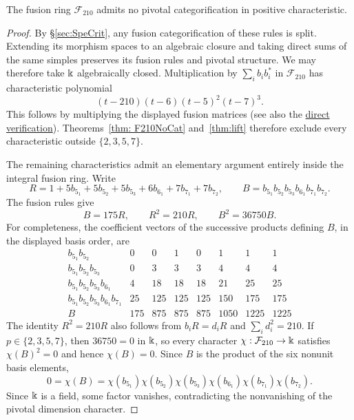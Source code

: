 \documentclass{amsart}
\begin{document}
\begin{corollary} \label{cor:PosChar}
The fusion ring $\mathcal{F}_{210}$ admits no pivotal categorification in positive characteristic.
\end{corollary}
\begin{proof}
By \S\ref{sec:SpeCrit}, any fusion categorification of these rules is split.
Extending its morphism spaces to an algebraic closure and taking direct sums
of the same simples preserves its fusion rules and pivotal structure.
We may therefore take $\Bbbk$ algebraically closed.
Multiplication by $\sum_i b_i b_i^*$ in $\mathcal F_{210}$ has characteristic polynomial
\[
 (t-210)(t-6)(t-5)^2(t-7)^3.
\]
This follows by multiplying the displayed fusion matrices (see also the \href{https://github.com/sebastienpalcoux/triangular-prism-categorification/blob/f816c697fde088b261e1fe1ce703980e5dbdab51/verify.py#L57-L69}{direct verification}). Theorems~\ref{thm: F210NoCat} and~\ref{thm:lift} therefore exclude every characteristic outside $\{2,3,5,7\}$.

The remaining characteristics admit an elementary argument entirely inside the integral fusion ring. Write
\[
 R=1+5b_{5_1}+5b_{5_2}+5b_{5_3}+6b_{6_1}+7b_{7_1}+7b_{7_2},
 \qquad B=b_{5_1}b_{5_2}b_{5_3}b_{6_1}b_{7_1}b_{7_2}.
\]
The fusion rules give
\begin{equation}\label{eq:positive-characteristic-certificate}
 B=175R,\qquad R^2=210R,\qquad B^2=36750B.
\end{equation}
For completeness, the coefficient vectors of the successive products defining $B$, in the displayed basis order, are
\[
\begin{array}{c|rrrrrrr}
 b_{5_1}b_{5_2}&0&0&1&0&1&1&1\\
 b_{5_1}b_{5_2}b_{5_3}&0&3&3&3&4&4&4\\
 b_{5_1}b_{5_2}b_{5_3}b_{6_1}&4&18&18&18&21&25&25\\
 b_{5_1}b_{5_2}b_{5_3}b_{6_1}b_{7_1}&25&125&125&125&150&175&175\\
 B&175&875&875&875&1050&1225&1225
\end{array}
\]
The identity $R^2=210R$ also follows from $b_iR=d_iR$ and $\sum_i d_i^2=210$. If $p\in\{2,3,5,7\}$, then $36750=0$ in $\Bbbk$, so every character $\chi:\mathcal F_{210}\to\Bbbk$ satisfies $\chi(B)^2=0$ and hence $\chi(B)=0$. Since $B$ is the product of the six nonunit basis elements,
\[
 0=\chi(B)=\chi(b_{5_1})\chi(b_{5_2})\chi(b_{5_3})
             \chi(b_{6_1})\chi(b_{7_1})\chi(b_{7_2}).
\]
Since $\Bbbk$ is a field, some factor vanishes, contradicting the nonvanishing of the pivotal dimension character.\qedhere
\end{proof}
\end{document}
